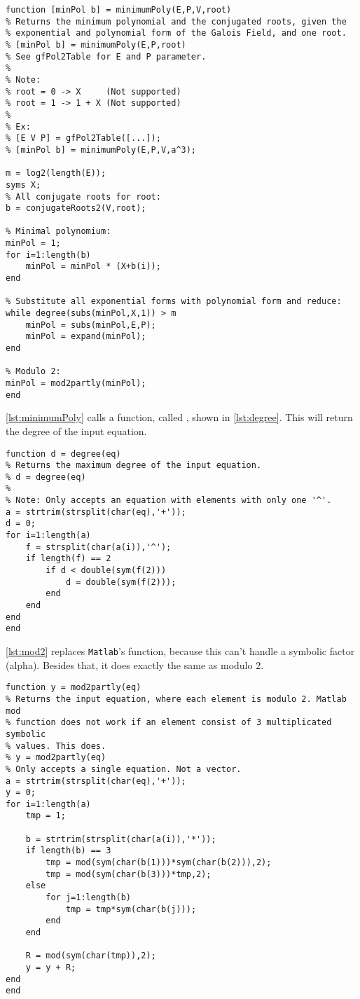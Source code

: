 \documentclass[Main]{subfiles}
\begin{document}
\begin{lstlisting}[caption=MinimumPoly, style=Code-Matlab, label=lst:minimumPoly]
function [minPol b] = minimumPoly(E,P,V,root)
% Returns the minimum polynomial and the conjugated roots, given the
% exponential and polynomial form of the Galois Field, and one root.
% [minPol b] = minimumPoly(E,P,root)
% See gfPol2Table for E and P parameter.
%
% Note: 
% root = 0 -> X     (Not supported)
% root = 1 -> 1 + X (Not supported)
%
% Ex: 
% [E V P] = gfPol2Table([...]);
% [minPol b] = minimumPoly(E,P,V,a^3);

m = log2(length(E));
syms X;
% All conjugate roots for root:
b = conjugateRoots2(V,root);

% Minimal polynomium:
minPol = 1;
for i=1:length(b)
    minPol = minPol * (X+b(i));
end
 
% Substitute all exponential forms with polynomial form and reduce:
while degree(subs(minPol,X,1)) > m
    minPol = subs(minPol,E,P);
    minPol = expand(minPol);
end

% Modulo 2:
minPol = mod2partly(minPol);
end
\end{lstlisting}

\codeTitle \ref{lst:minimumPoly} calls a function, called , shown in \codeTitle \ref{lst:degree}.
This will return the degree of the input equation.

\begin{lstlisting}[caption=Degree, style=Code-Matlab, label=lst:degree]
function d = degree(eq)
% Returns the maximum degree of the input equation.
% d = degree(eq)
%
% Note: Only accepts an equation with elements with only one '^'.
a = strtrim(strsplit(char(eq),'+'));
d = 0;
for i=1:length(a)
    f = strsplit(char(a(i)),'^');
    if length(f) == 2
        if d < double(sym(f(2)))
            d = double(sym(f(2)));
        end
    end
end
end
\end{lstlisting}


\codeTitle \ref{lst:mod2} replaces \texttt{Matlab}'s  function, because this can't handle a symbolic factor (alpha).
Besides that, it does exactly the same as modulo 2.

\begin{lstlisting}[caption=Mod2Partly, style=Code-Matlab, label=lst:mod2]
function y = mod2partly(eq)
% Returns the input equation, where each element is modulo 2. Matlab mod
% function does not work if an element consist of 3 multiplicated symbolic
% values. This does. 
% y = mod2partly(eq)
% Only accepts a single equation. Not a vector.
a = strtrim(strsplit(char(eq),'+'));
y = 0;
for i=1:length(a)
    tmp = 1;
    
    b = strtrim(strsplit(char(a(i)),'*'));
    if length(b) == 3
        tmp = mod(sym(char(b(1)))*sym(char(b(2))),2);
        tmp = mod(sym(char(b(3)))*tmp,2);
    else
        for j=1:length(b)
            tmp = tmp*sym(char(b(j)));
        end
    end
    
    R = mod(sym(char(tmp)),2);
    y = y + R;
end
end
\end{lstlisting}
\end{document}
